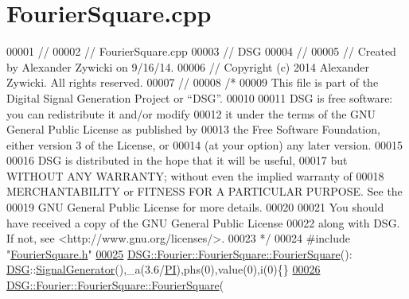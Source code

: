\hypertarget{_fourier_square_8cpp_source}{\section{Fourier\+Square.\+cpp}
\label{_fourier_square_8cpp_source}
}

\begin{DoxyCode}
00001 \textcolor{comment}{//}
00002 \textcolor{comment}{//  FourierSquare.cpp}
00003 \textcolor{comment}{//  DSG}
00004 \textcolor{comment}{//}
00005 \textcolor{comment}{//  Created by Alexander Zywicki on 9/16/14.}
00006 \textcolor{comment}{//  Copyright (c) 2014 Alexander Zywicki. All rights reserved.}
00007 \textcolor{comment}{//}
00008 \textcolor{comment}{/*}
00009 \textcolor{comment}{ This file is part of the Digital Signal Generation Project or “DSG”.}
00010 \textcolor{comment}{}
00011 \textcolor{comment}{ DSG is free software: you can redistribute it and/or modify}
00012 \textcolor{comment}{ it under the terms of the GNU General Public License as published by}
00013 \textcolor{comment}{ the Free Software Foundation, either version 3 of the License, or}
00014 \textcolor{comment}{ (at your option) any later version.}
00015 \textcolor{comment}{}
00016 \textcolor{comment}{ DSG is distributed in the hope that it will be useful,}
00017 \textcolor{comment}{ but WITHOUT ANY WARRANTY; without even the implied warranty of}
00018 \textcolor{comment}{ MERCHANTABILITY or FITNESS FOR A PARTICULAR PURPOSE.  See the}
00019 \textcolor{comment}{ GNU General Public License for more details.}
00020 \textcolor{comment}{}
00021 \textcolor{comment}{ You should have received a copy of the GNU General Public License}
00022 \textcolor{comment}{ along with DSG.  If not, see <http://www.gnu.org/licenses/>.}
00023 \textcolor{comment}{ */}
00024 \textcolor{preprocessor}{#include "\hyperlink{_fourier_square_8h}{FourierSquare.h}"}
\hypertarget{_fourier_square_8cpp_source_l00025}{}\hyperlink{class_d_s_g_1_1_fourier_1_1_fourier_square_a48fa53b8b5ea77013e1bbb2b2467d15e}{00025} \hyperlink{class_d_s_g_1_1_fourier_1_1_fourier_square_a48fa53b8b5ea77013e1bbb2b2467d15e}{DSG::Fourier::FourierSquare::FourierSquare}():
      \hyperlink{namespace_d_s_g}{DSG}::\hyperlink{class_d_s_g_1_1_signal_generator}{SignalGenerator}(),\_a(3.6/\hyperlink{_p_i_8h_a598a3330b3c21701223ee0ca14316eca}{PI}),phs(0),value(0),i(0)\{\}
\hypertarget{_fourier_square_8cpp_source_l00026}{}\hyperlink{class_d_s_g_1_1_fourier_1_1_fourier_square_a277316295ca15354a6e507a71cb5f0db}{00026} \hyperlink{class_d_s_g_1_1_fourier_1_1_fourier_square_a48fa53b8b5ea77013e1bbb2b2467d15e}{DSG::Fourier::FourierSquare::FourierSquare}(

\end{DoxyCode}
